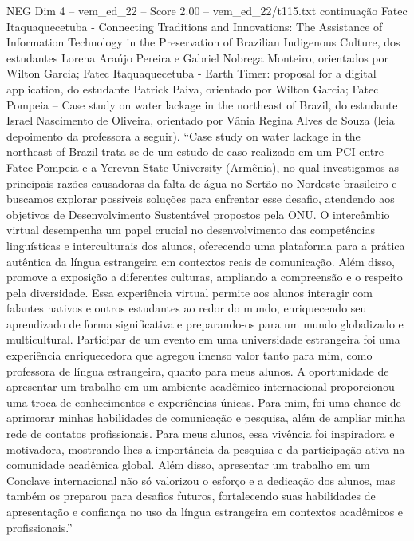 \begin{textsample}{NEG Dim 4 – vem\_ed\_22 – Score 2.00 – vem\_ed\_22/t115.txt}  \label{ex:f4_neg_016}
continuação Fatec Itaquaquecetuba - Connecting Traditions and Innovations: The Assistance of Information Technology in the Preservation of Brazilian Indigenous Culture, dos estudantes Lorena Araújo Pereira e Gabriel Nobrega Monteiro, orientados por Wilton Garcia; Fatec Itaquaquecetuba - Earth Timer: proposal for a digital application, do estudante Patrick Paiva, orientado por Wilton Garcia; Fatec Pompeia – Case study on water lackage in the northeast of Brazil, do estudante Israel Nascimento de Oliveira, orientado por Vânia Regina Alves de Souza (leia depoimento da professora a seguir). “Case study on water lackage in the northeast of Brazil trata-se de um estudo de caso realizado em um PCI entre Fatec Pompeia e a Yerevan State University (Armênia), no qual investigamos as principais razões causadoras da falta de água no Sertão no Nordeste brasileiro e buscamos explorar possíveis soluções para enfrentar esse desafio, atendendo aos objetivos de Desenvolvimento Sustentável propostos pela ONU.
O intercâmbio virtual desempenha um papel crucial no desenvolvimento das competências linguísticas e interculturais dos alunos, oferecendo uma plataforma para a prática autêntica da língua estrangeira em contextos reais de comunicação.
Além disso, promove a exposição a diferentes culturas, ampliando a compreensão e o respeito pela diversidade.
Essa experiência virtual permite aos alunos interagir com falantes nativos e outros estudantes ao redor do mundo, enriquecendo seu aprendizado de forma significativa e preparando-os para um mundo globalizado e multicultural.
Participar de um evento em uma universidade estrangeira foi uma experiência enriquecedora que agregou imenso valor tanto para mim, como professora de língua estrangeira, quanto para meus alunos.
A oportunidade de apresentar um trabalho em um ambiente acadêmico internacional proporcionou uma troca de conhecimentos e experiências únicas.
Para mim, foi uma chance de aprimorar minhas habilidades de comunicação e pesquisa, além de ampliar minha rede de contatos profissionais.
Para meus alunos, essa vivência foi inspiradora e motivadora, mostrando-lhes a importância da pesquisa e da participação ativa na comunidade acadêmica global.
Além disso, apresentar um trabalho em um Conclave internacional não só valorizou o esforço e a dedicação dos alunos, mas também os preparou para desafios futuros, fortalecendo suas habilidades de apresentação e confiança no uso da língua estrangeira em contextos acadêmicos e profissionais.”

\end{textsample}
